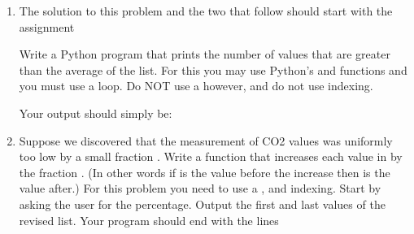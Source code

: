 \documentclass[letterpaper,10pt,english]{sphinxmanual}
\begin{document}
\begin{enumerate}
\begin{sphinxVerbatim}[commandchars=\\\{\}]
\PYG{p}{[}\PYG{p}{]} \PYG{p}{[}\PYG{p}{]} 
\PYG{p}{[}\PYG{p}{]} \PYG{p}{[}\PYG{p}{]} 
\PYG{p}{[}\PYG{p}{]} \PYG{p}{[}\PYG{p}{]} 
\end{sphinxVerbatim}

\item {} 
The solution to this problem and the two that follow should start
with the assignment

%
\begin{sphinxVerbatim}[commandchars=\\\{\}]
  \PYG{p}{[}      \PYGZbs{}
                     \PYG{p}{]}
\end{sphinxVerbatim}

Write a Python program that prints the number of values that are greater
than the average of the list.  For this you may use Python’s
 and  functions and you must use a  loop.  Do
NOT use a  however, and do not use indexing.

Your output should simply be:

%
\begin{sphinxVerbatim}[commandchars=\\\{\}]
 
   
\end{sphinxVerbatim}

\item {} 
Suppose we discovered that the measurement of CO2 values was
uniformly too low by a small fraction .  Write a function that
increases each value in  by the fraction .  (In
other words if  is the value before the increase then
 is the value after.)  For this problem you need to use
a ,  and indexing.  Start by asking the user for the
percentage.  Output the first and last values of the revised list.
Your program should end with the lines


\end{enumerate}
\end{document}
